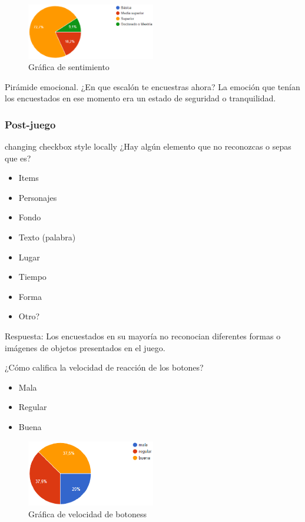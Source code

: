 \begin{figure}
	\centering
	\caption{Gráfica de sentimiento}
	\label{fig:pre05}
	\includegraphics[width=0.5\textwidth]{04ResultadosObetnidos/pruebaR/imagenes/que/pre01}
\end{figure}

	
	 Pirámide emocional. ¿En que escalón te encuestras ahora?
	La emoción que tenían los encuestados en ese momento era un estado de seguridad o tranquilidad.
	
	


\subsubsection{Post-juego}

	
 changing checkbox style locally
	¿Hay algún elemento que no reconozcas  o sepas que es?
	\begin{itemize}
		\item Items
		\item Personajes
		\item Fondo
		\item Texto (palabra)
		\item Lugar
		\item Tiempo
		\item Forma
		\item Otro?
	\end{itemize}

Respuesta: Los encuestados en su mayoría no reconocian diferentes formas o imágenes de objetos presentados en el juego.	

	¿Cómo califica la velocidad de reacción de los botones?
	\begin{itemize}
		\item Mala
		\item Regular
		\item Buena
	\end{itemize}

\begin{figure}
	\centering
	\caption{Gráfica de velocidad de botoness}
	\label{fig:pos01}
	\includegraphics[width=0.5\textwidth]{04ResultadosObetnidos/pruebaR/imagenes/que/pos01}
\end{figure}

